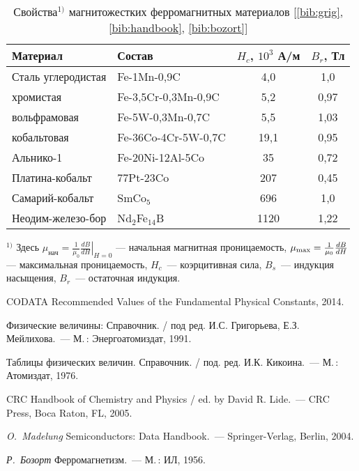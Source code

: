 \begin{booksupplement}
\begin{table}
\caption{Свойства$^{1)}$ магнитожестких ферромагнитных материалов
[\ref{bib:grig}, \ref{bib:handbook}, \ref{bib:bozort}]}
\centering\small
 \begin{tabular}{p{3.2cm}lcc}
 \toprule[1pt]
Материал & Состав & $H_c$, $10^3$ А/м & $B_r$, Тл \\
\midrule[1pt]
Сталь углеродистая & Fe-1Mn-0,9C & 4,0 & 1,0 \\
\quad хромистая & Fe-3,5Cr-0,3Mn-0,9C & 5,2 & 0,97 \\
\quad вольфрамовая & Fe-5W-0,3Mn-0,7C & 5,5 & 1,03 \\
\quad кобальтовая & Fe-36Co-4Cr-5W-0,7C & 19,1 & 0,95 \\
Альнико-1 & Fe-20Ni-12Al-5Co & 35 & 0,72 \\
Платина-кобальт & 77Pt-23Co & 207 & 0,45 \\
Самарий-кобальт & SmCo$_5$ & 696 & 1,0 \\
Неодим-железо-бор & Nd$_2$Fe$_{14}$B & 1120 & 1,22 \\
\bottomrule
 \end{tabular}\par
\bigskip
\raggedright\noindent
$^{1)}$ Здесь $\mu_{нач}=\frac{1}{\mu_0}\left.\frac{dB}{dH}\right|_{H=0}$ --- начальная
магнитная проницаемость,
$\mu_{\rm max}=\frac{1}{\mu_0}\frac{dB}{dH}$ --- максимальная
проницаемость, $H_c$~--- коэрцитивная сила, $B_s$~--- индукция насыщения,
$B_r$~--- остаточная индукция.
\end{table}




\clearpage

\begin{lab:literature}
 \item \label{bib:codata} CODATA Recommended Values of the Fundamental Physical Constants, 2014.
 \item \label{bib:grig} Физические величины: Справочник. /
    под ред. И.С. Григорьева, Е.З. Мейлихова.~--- М.\,: Энергоатомиздат, 1991.
 \item \label{bib:kikoin} Таблицы физических величин. Справочник. /
    под. ред. И.К. Кикоина.~--- М.\,: Атомиздат, 1976.
 \item \label{bib:handbook} CRC Handbook of Chemistry and Physics / ed. by David R. Lide.~---
 CRC Press, Boca Raton, FL, 2005.
 \item \label{bib:semi} \textit{O.~Madelung} Semiconductors: Data Handbook.~---
 Springer-Verlag, Berlin, 2004.
 \item \label{bib:bozort} \textit{Р.~Бозорт} Ферромагнетизм.~--- М.\,: ИЛ, 1956.

\end{lab:literature}

\end{booksupplement}
